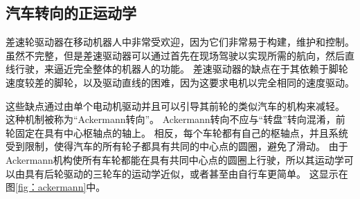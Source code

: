 \subsection{汽车转向的正运动学}

差速轮驱动器在移动机器人中非常受欢迎，因为它们非常易于构建，维护和控制。 虽然不完整，但是差速驱动器可以通过首先在现场驾驶以实现所需的航向，然后直线行驶，来逼近完全整体的机器人的功能。 差速驱动器的缺点在于其依赖于脚轮速度较差的脚轮，以及驱动直线的困难，因为这要求电机以完全相同的速度驱动。


这些缺点通过由单个电动机驱动并且可以引导其前轮的类似汽车的机构来减轻。 这种机制被称为“Ackermann转向”。 Ackermann转向不应与“转盘”转向混淆，前轮固定在具有中心枢轴点的轴上。 相反，每个车轮都有自己的枢轴点，并且系统受到限制，使得汽车的所有轮子都具有共同的中心点的圆圈，避免了滑动。 由于Ackermann机构使所有车轮都能在具有共同中心点的圆圈上行驶，所以其运动学可以由具有后轮驱动的三轮车的运动学近似，或者甚至由自行车更简单。 这显示在图\ref {fig：ackermann}中。

